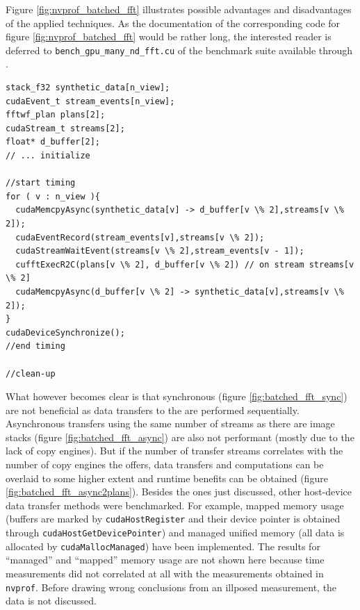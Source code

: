 Figure \ref{fig:nvprof_batched_fft} illustrates possible advantages and disadvantages of the applied techniques. As the documentation of the corresponding code for figure \ref{fig:nvprof_batched_fft} would be rather long, the interested reader is deferred to \texttt{bench\_gpu\_many\_nd\_fft.cu} of the \lmvn{} benchmark suite available through \cite{lmvn_repo}. 

\begin{lstlisting}[caption={Asynchronous Batched FFT on synthetic data performed on GPU in pseudo-code based on the \cufft{} syntax.},label={lst:batched_fft_gpu_async2plans}]
stack_f32 synthetic_data[n_view];
cudaEvent_t stream_events[n_view];
fftwf_plan plans[2];
cudaStream_t streams[2];
float* d_buffer[2];
// ... initialize 

//start timing
for ( v : n_view ){
  cudaMemcpyAsync(synthetic_data[v] -> d_buffer[v \% 2],streams[v \% 2]);
  cudaEventRecord(stream_events[v],streams[v \% 2]);
  cudaStreamWaitEvent(streams[v \% 2],stream_events[v - 1]);
  cufftExecR2C(plans[v \% 2], d_buffer[v \% 2]) // on stream streams[v \% 2]
  cudaMemcpyAsync(d_buffer[v \% 2] -> synthetic_data[v],streams[v \% 2]);
}
cudaDeviceSynchronize();
//end timing

//clean-up
\end{lstlisting}


What however becomes clear is that synchronous (figure \ref{fig:batched_fft_sync}) are not beneficial as data transfers to the \gpu{} are performed sequentially. Asynchronous transfers using the same number of streams as there are image stacks (figure \ref{fig:batched_fft_async}) are also not performant (mostly due to the lack of copy engines). But if the number of transfer streams correlates with the number of copy engines the \gpu{} offers, data transfers and computations can be overlaid to some higher extent and runtime benefits can be obtained (figure \ref{fig:batched_fft_async2plans}). Besides the ones just discussed, other host-device data transfer methods were benchmarked. 
For example, mapped memory usage (buffers are marked by \texttt{cudaHostRegister} and their device pointer is obtained through \texttt{cudaHostGetDevicePointer}) and managed unified memory (all data is allocated by \texttt{cudaMallocManaged}) have been implemented. The results for ``managed'' and ``mapped'' memory usage are not shown here because time measurements did not correlated at all with the measurements obtained in \texttt{nvprof}. Before drawing wrong conclusions from an illposed measurement, the data is not discussed. 

